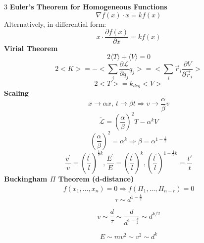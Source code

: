 \documentclass[1pt]{article}
\begin{document}
\begin{multicols}{3}
\textbf{Euler’s Theorem for Homogeneous Functions}
\begin{equation*}
    \nabla f(x) \cdot x = k f(x)
\end{equation*}
Alternatively, in differential form:
\begin{equation*}
    x \cdot \frac{\partial f(x)}{\partial x} = k f(x)
\end{equation*}
\textbf{Virial Theorem}
\begin{equation*}
    2 \langle T \rangle + \langle V \rangle = 0
\end{equation*}
\begin{equation*}
    2<K>=-<\sum_j \frac{\partial \mathcal{L}}{\partial q_j} q_j>=<\sum_i \vec{r}_i \frac{\partial V}{\partial \vec{r}_i}>
\end{equation*}
\[2<T>=k_{deg }<V>\]
\textbf{Scaling}
\[x\rightarrow\alpha x,\ t\rightarrow\beta t\Rightarrow v\rightarrow\frac{\alpha}{\beta}v\]
\[\tilde{\mathcal{L}}=\left(\frac{\alpha}{\beta}\right)^{2}T-\alpha^{k}V\]
\[\left(\frac{\alpha}{\beta}\right)^{2}=\alpha^{k}\Rightarrow\beta=\alpha^{1-\frac{k}{2}}\]
\begin{equation*}
    \frac{v^{\prime}}{v}=\left(\frac{l^{\prime}}{l}\right)^{\frac{1}{2} k}, \frac{E^{\prime}}{E}=\left(\frac{l^{\prime}}{l}\right)^k,\left(\frac{l^{\prime}}{l}\right)^{1-\frac{1}{2}k}=\frac{t'}{t}
\end{equation*}
\textbf{Buckingham $\Pi$ Theorem (d-distance)}
\begin{align*}
        f(x_1, ..., x_n) = 0 \Rightarrow f(\Pi_1, ..., \Pi_{n-r}) = 0
\end{align*}
\begin{equation*}
    \tau \sim d^{1 - \frac{k}{2}}
\end{equation*}

\begin{equation*}
    v \sim \frac{d}{\tau} \sim \frac{d}{d^{1 - \frac{k}{2}}} \sim d^{k/2}
\end{equation*}

\begin{equation*}
    E \sim m v^2 \sim v^2 \sim d^k
\end{equation*}


\end{multicols}
\end{document}
